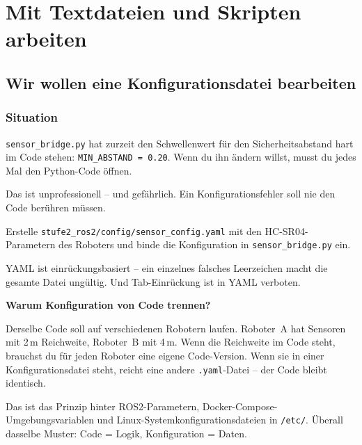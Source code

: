\part{Mit Textdateien und Skripten arbeiten}

\chapter{Wir wollen eine Konfigurationsdatei bearbeiten}

\kapitelstruktur

\section{Situation}

\texttt{sensor\_bridge.py} hat zurzeit den Schwellenwert
für den Sicherheitsabstand hart im Code stehen:
\texttt{MIN\_ABSTAND = 0.20}. Wenn du ihn ändern willst,
musst du jedes Mal den Python-Code öffnen.

Das ist unprofessionell -- und gefährlich.
Ein Konfigurationsfehler soll nie den Code berühren müssen.

\begin{aufgabeBox}
Erstelle \texttt{stufe2\_ros2/config/sensor\_config.yaml}
mit den HC-SR04-Parametern des Roboters und
binde die Konfiguration in \texttt{sensor\_bridge.py} ein.
\end{aufgabeBox}

\begin{problemBox}
YAML ist einrückungsbasiert -- ein einzelnes falsches Leerzeichen
macht die gesamte Datei ungültig. Und Tab-Einrückung
ist in YAML verboten.
\end{problemBox}

\begin{haubeBox}
\textbf{Warum Konfiguration von Code trennen?}

Derselbe Code soll auf verschiedenen Robotern laufen.
Roboter~A hat Sensoren mit 2\,m Reichweite, Roboter~B mit 4\,m.
Wenn die Reichweite im Code steht, brauchst du für jeden
Roboter eine eigene Code-Version.
Wenn sie in einer Konfigurationsdatei steht, reicht eine
andere \texttt{.yaml}-Datei -- der Code bleibt identisch.

Das ist das Prinzip hinter ROS2-Parametern,
Docker-Compose-Umgebungsvariablen und
Linux-Systemkonfigurationsdateien in \texttt{/etc/}.
Überall dasselbe Muster: Code = Logik, Konfiguration = Daten.
\end{haubeBox}

